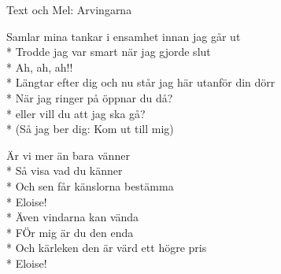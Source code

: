\begin{SongText}[Eloise]
    \begin{SongInfo}
        Text och Mel: Arvingarna
    \end{SongInfo}
    \begin{SongVerse}
        Samlar mina tankar i ensamhet innan jag går ut\\*%
        Trodde jag var smart när jag gjorde slut\\*%
        Ah, ah, ah!!\\*%
        Längtar efter dig och nu står jag här utanför din dörr\\*%
        När jag ringer på öppnar du då?\\*%
        eller vill du att jag ska gå?\\*%
        (Så jag ber dig: Kom ut till mig)
    \end{SongVerse}
    \begin{SongVerse}
        Är vi mer än bara vänner\\*%
        Så visa vad du känner\\*%
        Och sen får känslorna bestämma\\*%
        Eloise!\\*%
        Även vindarna kan vända\\*%
        FÖr mig är du den enda\\*%
        Och kärleken den är värd ett högre pris\\*%
        Eloise!
    \end{SongVerse}
\end{SongText}
